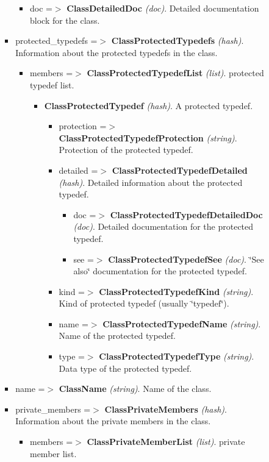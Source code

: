 \begin{itemize}
\begin{itemize}
\begin{itemize}
\begin{itemize}
\begin{itemize}
\item doc =$>$ {\bf ClassDetailedDoc} {\em (doc)\/}. Detailed documentation block for the class. \end{itemize}
\item protected\_\-typedefs =$>$ {\bf ClassProtectedTypedefs} {\em (hash)\/}. Information about the protected typedefs in the class. \begin{itemize}
\item members =$>$ {\bf ClassProtectedTypedefList} {\em (list)\/}. protected typedef list. \begin{itemize}
\item {\bf ClassProtectedTypedef} {\em (hash)\/}. A protected typedef. \begin{itemize}
\item protection =$>$ {\bf ClassProtectedTypedefProtection} {\em (string)\/}. Protection of the protected typedef. \item detailed =$>$ {\bf ClassProtectedTypedefDetailed} {\em (hash)\/}. Detailed information about the protected typedef. \begin{itemize}
\item doc =$>$ {\bf ClassProtectedTypedefDetailedDoc} {\em (doc)\/}. Detailed documentation for the protected typedef. \item see =$>$ {\bf ClassProtectedTypedefSee} {\em (doc)\/}. \char`\"{}See also\char`\"{} documentation for the protected typedef. \end{itemize}
\item kind =$>$ {\bf ClassProtectedTypedefKind} {\em (string)\/}. Kind of protected typedef (usually \char`\"{}typedef\char`\"{}). \item name =$>$ {\bf ClassProtectedTypedefName} {\em (string)\/}. Name of the protected typedef. \item type =$>$ {\bf ClassProtectedTypedefType} {\em (string)\/}. Data type of the protected typedef. \end{itemize}
\end{itemize}
\end{itemize}
\item name =$>$ {\bf ClassName} {\em (string)\/}. Name of the class. \item private\_\-members =$>$ {\bf ClassPrivateMembers} {\em (hash)\/}. Information about the private members in the class. \begin{itemize}
\item members =$>$ {\bf ClassPrivateMemberList} {\em (list)\/}. private member list. \begin{itemize}

\end{itemize}
\end{itemize}
\end{itemize}
\end{itemize}
\end{itemize}
\end{itemize}
